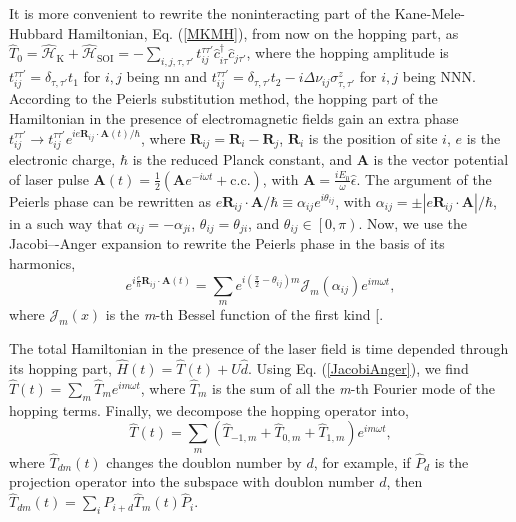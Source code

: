 \documentclass[aps,prl,twocolumn,amsmath,amssymb,nobibnotes]{revtex4-1}%
\renewcommand{\cite}[1]{{[}\onlinecite{#1}{]}}
\newcommand{\bs}{\boldsymbol}
\begin{document}
It is more convenient to rewrite the noninteracting part of the Kane-Mele-Hubbard Hamiltonian, Eq. (\ref{MKMH}), from now on the hopping part, as $\hat{T}_0=\hat{\mathcal{H}}_{\text{K}}+\hat{\mathcal{H}}_{\text{SOI}} = - \sum_{i,j , \tau, \tau'}
t_{ij}^{\tau\tau'} \hat{c}_{i \tau}^\dagger \hat{c}_{j \tau'}$, where the hopping amplitude is $t_{ij}^{\tau\tau'} = \delta_{\tau,\tau'}t_1$ for $i,j$ being nn and $t_{ij}^{\tau\tau'} = \delta_{\tau,\tau'}t_2 - i\Delta\nu_{ij}\sigma^z_{\tau, \tau'}$ for $i,j$ being NNN.
According to the Peierls substitution method, the hopping part of the Hamiltonian in the presence of electromagnetic fields gain an extra phase $t_{ij}^{\tau\tau'}\rightarrow t_{ij}^{\tau\tau'} e^{{i e \bs{R}_{ij} \cdot \bs{A}(t)}/\hbar}$, where $\bs{R}_{ij} = \bs{R}_i-\bs{R}_j$, $\bs{R}_i$ is the position of site $i$, $e$ is the electronic charge, $\hbar$ is the reduced Planck constant, and $\bs{A}$ is the vector potential of laser pulse $\bs{A}(t) = \frac{1}{2}(\bs{A} e^{-i\omega t} + \mathrm{c.c.})$, with $\bs{A} = \frac{iE_0}{\omega}\hat{\epsilon}$.
The argument of the Peierls phase can be rewritten as $e\bs{R}_{ij}\cdot\bs{A}/\hbar \equiv \alpha_{ij} e^{i \theta_{ij}}$, with $\alpha_{ij} = \pm|e\bs{R}_{ij}\cdot \bs{A}|/\hbar$, in a such way that $\alpha_{ij}= -\alpha_{ji}$, $\theta_{ij}= \theta_{ji}$, and $\theta_{ij} \in \left[0,\pi\right)$.
Now, we use the Jacobi–-Anger expansion to rewrite the Peierls phase in the basis of its harmonics,
\begin{equation}
\label{JacobiAnger}
e^{i\frac{e}{\hbar}\bs{R}_{ij}\cdot\bs{A}(t)} = \sum_m e^{i(\frac{\pi}{2}-\theta_{ij})m} \mathcal{J}_m(\alpha_{ij}) e^{im\omega t},
\end{equation}
where $\mathcal{J}_m(x)$ is the \textit{m}-th Bessel function of the first kind \cite{Kitamura2017}.

The total Hamiltonian in the presence of the laser field is time depended through its hopping part, $\hat{H}(t) = \hat{T}(t) +  U\hat{d}$. Using Eq. (\ref{JacobiAnger}), we find $\hat{T}(t) = \sum_m \hat{T}_m e^{im \omega t}$, where $\hat{T}_m$ is the sum of all the \textit{m}-th Fourier mode of the hopping terms. Finally, we decompose the hopping operator into,
\begin{equation}
\hat{T}(t) = \sum_m (\hat{T}_{-1,m}+\hat{T}_{0,m}+\hat{T}_{1,m})e^{im\omega t},
\end{equation}
where $\hat{T}_{dm}(t)$ changes the doublon number by $d$, for example, if $\hat{P}_d$ is the projection operator into the subspace with doublon number $d$, then $\hat{T}_{dm}(t) = \sum_i \hat{P}_{i+d}\hat{T}_{m}(t)\hat{P}_i$.
\end{document}
